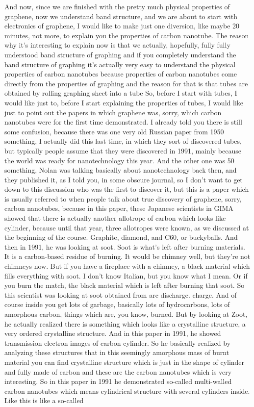 And now, since we are finished with the pretty much physical properties of graphene, now we understand band structure, and we are about to start with electronics of graphene, I would like to make just one diversion, like maybe 20 minutes, not more, to explain you the properties of carbon nanotube. The reason why it's interesting to explain now is that we actually, hopefully, fully fully understood band structure of graphing and if you completely understand the band structure of graphing it's actually very easy to understand the physical properties of carbon nanotubes because properties of carbon nanotubes come directly from the properties of graphing and the reason for that is that tubes are obtained by rolling graphing sheet into a tube So, before I start with tubes, I would like just to, before I start explaining the properties of tubes, I would like just to point out the papers in which graphene was, sorry, which carbon nanotubes were for the first time demonstrated. I already told you there is still some confusion, because there was one very old Russian paper from 1950 something, I actually did this last time, in which they sort of discovered tubes, but typically people assume that they were discovered in 1991, mainly because the world was ready for nanotechnology this year. And the other one was 50 something, Nolan was talking basically about nanotechnology back then, and they published it, as I told you, in some obscure journal, so I don't want to get down to this discussion who was the first to discover it, but this is a paper which is usually referred to when people talk about true discovery of graphene, sorry, carbon nanotubes, because in this paper, these Japanese scientists in GIMA showed that there is actually another allotrope of carbon which looks like cylinder, because until that year, three allotropes were known, as we discussed at the beginning of the course. Graphite, diamond, and C60, or buckyballs. And then in 1991, he was looking at soot. Soot is what's left after burning materials. It is a carbon-based residue of burning. It would be chimney well, but they're not chimneys now. But if you have a fireplace with a chimney, a black material which fills everything with soot. I don't know Italian, but you know what I mean. Or if you burn the match, the black material which is left after burning that soot. So this scientist was looking at soot obtained from arc discharge. charge. And of course inside you get lots of garbage, basically lots of hydrocarbons, lots of amorphous carbon, things which are, you know, burned. But by looking at Zoot, he actually realized there is something which looks like a crystalline structure, a very ordered crystalline structure. And in this paper in 1991, he showed transmission electron images of carbon cylinder. So he basically realized by analyzing these structures that in this seemingly amorphous mass of burnt material you can find crystalline structure which is just in the shape of cylinder and fully made of carbon and these are the carbon nanotubes which is very interesting. So in this paper in 1991 he demonstrated so-called multi-walled carbon nanotubes which means cylindrical structure with several cylinders inside. Like this is like a so-called 